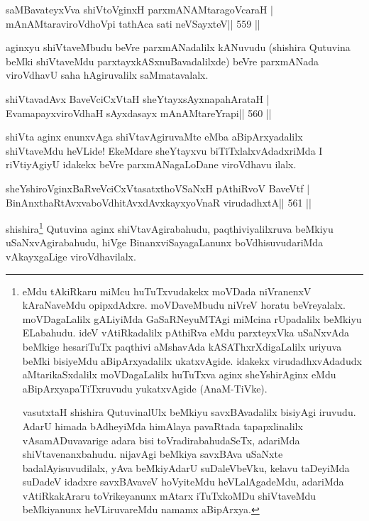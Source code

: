 \begin{shl}
saMBavateyxVva shiVtoV\s ginxH parxmANAMtaragoVcaraH |
mAnAMtaraviroVdhoV\s pi tathAca sati neVSayxteV\hfill || 559 ||
\end{shl}

\begin{artha}
aginxyu shiVtaveMbudu beVre parxmANadalilx kANuvudu (shishira Qutuvina beMki shiVtaveMdu parxtayxkASxnuBavadalilxde) beVre parxmANada viroVdhavU saha hAgiruvalilx saMmatavalalx.
\end{artha}

\begin{shl}
shiVtavadAvx BaveVciCxVtaH sheYtayxsAyxnapahArataH |
EvamapayxviroVdhaH sAyxdasayx mAnAMtareYrapi\hfill || 560 ||
\end{shl}

\begin{artha}
shiVta aginx enunxvAga shiVtavAgiruvaMte eMba aBipArxyadalilx shiVtaveMdu heVLide! EkeMdare sheYtayxvu biTiTxlalxvAdadxriMda I riVtiyAgiyU idakekx beVre parxmANagaLoDane viroVdhavu ilalx.
\end{artha}

\begin{shl}
sheYshiroV\s ginxBaRveVciCxVtasatxthoVSaNxH pAthiRvoV BaveVtf |
BinAnxthaRtAvxvaboVdhitAvxdAvxkayxyoVnaR virudadhxtA\hfill || 561 ||
\end{shl}

\begin{artha}
shishira\footnote[1]{eMdu tAkiRkaru miMcu huTuTxvudakekx moVDada niVranenxV
kAraNaveMdu opipxdAdxre. moVDaveMbudu niVreV horatu beVreyalalx.
moVDagaLalilx gALiyiMda GaSaRNeyuMTAgi miMcina rUpadalilx beMkiyu
ELabahudu. ideV vAtiRkadalilx pAthiRva eMdu parxteyxVka uSaNxvAda
beMkige hesariTuTx paqthivi aMshavAda kASAThxrXdigaLalilx uriyuva beMki
bisiyeMdu aBipArxyadalilx ukatxvAgide. idakekx virudadhxvAdadudx
aMtarikaSxdalilx moVDagaLalilx huTuTxva aginx sheYshirAginx eMdu
aBipArxyapaTiTxruvudu yukatxvAgide (AnaM-TiVke).

vasutxtaH shishira QutuvinalUlx beMkiyu savxBAvadalilx bisiyAgi
iruvudu. AdarU himada bAdheyiMda himAlaya pavaRtada tapapxlinalilx
vAsamADuvavarige adara bisi toVradirabahudaSeTx, adariMda
shiVtavenanxbahudu. nijavAgi beMkiya savxBAva uSaNxte
badalAyisuvudilalx, yAva beMkiyAdarU suDaleVbeVku, kelavu taDeyiMda
suDadeV idadxre savxBAvaveV hoVyiteMdu heVLalAgadeMdu, adariMda
vAtiRkakAraru toVrikeyanunx mAtarx iTuTxkoMDu shiVtaveMdu beMkiyanunx
heVLiruvareMdu namamx aBipArxya.} Qutuvina aginx shiVtavAgirabahudu, paqthiviyalilxruva beMkiyu
uSaNxvAgirabahudu, hiVge BinanxviSayagaLanunx boVdhisuvudariMda
vAkayxgaLige viroVdhavilalx.
\end{artha}


